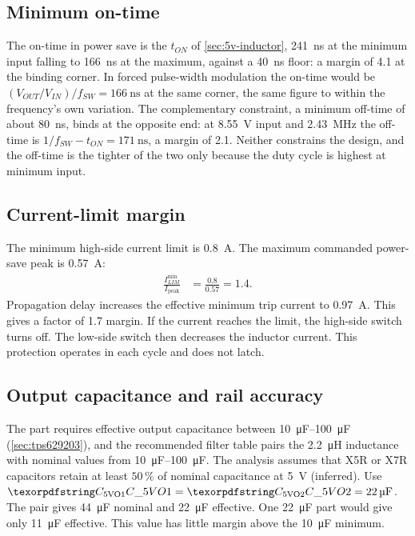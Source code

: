\subsection{Minimum on-time}\label{sec:5v-ontime}

The on-time in power save is the $t_{ON}$ of \cref{sec:5v-inductor},
\SI{241}{\nano\second} at the minimum input falling to \SI{166}{\nano\second} at
the maximum, against a \SI{40}{\nano\second} floor: a margin of \num{4.1} at the
binding corner. In forced pulse-width modulation the on-time would be
$(V_{OUT}/V_{IN})/f_{SW} = \SI{166}{\nano\second}$ at the same corner, the same
figure to within the frequency's own variation. The complementary
constraint, a minimum off-time of about \SI{80}{\nano\second}, binds at the
opposite end: at \SI{8.55}{\volt} input and \SI{2.43}{\mega\hertz} the off-time is
$1/f_{SW} - t_{ON} = \SI{171}{\nano\second}$, a margin of \num{2.1}. Neither
constrains the design, and the off-time is the tighter of the two only because
the duty cycle is highest at minimum input.

\subsection{Current-limit margin}\label{sec:5v-ilim}

The minimum high-side current limit is \SI{0.8}{\ampere}. The maximum commanded
power-save peak is \SI{0.57}{\ampere}:
\begin{align*}
  \frac{I_{LIM}^{\min}}{I_{\mathrm{peak}}} &= \frac{0.8}{0.57} = 1.4.
\end{align*}
Propagation delay increases the effective minimum trip current to
\SI{0.97}{\ampere}. This gives a factor of 1.7 margin. If the current reaches
the limit, the high-side switch turns off. The low-side switch then decreases
the inductor current. This protection operates in each cycle and does not latch.

\subsection{Output capacitance and rail accuracy}\label{sec:5v-cout}

The part requires effective output capacitance between \SIrange{10}{100}{\micro\farad}
(\cref{sec:tps629203}), and the recommended filter table pairs the
\SI{2.2}{\micro\henry} inductance with nominal values from \SIrange{10}{100}{\micro\farad}.
The analysis assumes that X5R or X7R capacitors retain at least $50\,\%$ of
nominal capacitance at \SI{5}{\volt} (inferred). Use
$\des{C}{5VO1} = \des{C}{5VO2} = \SI{22}{\micro\farad}$. The pair gives
\SI{44}{\micro\farad} nominal and \SI{22}{\micro\farad} effective. One
\SI{22}{\micro\farad} part would give only \SI{11}{\micro\farad} effective.
This value has little margin above the \SI{10}{\micro\farad} minimum.

